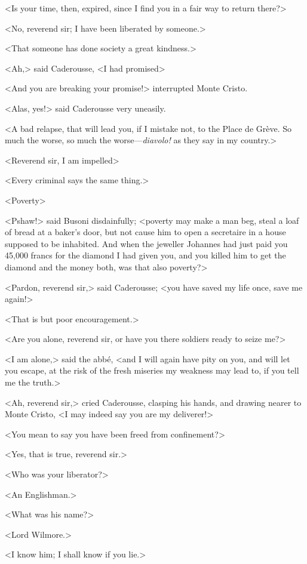  <Is your time, then, expired, since I find you in a fair way to return there?> 

 <No, reverend sir; I have been liberated by someone.> 

 <That someone has done society a great kindness.> 

 <Ah,> said Caderousse, <I had promised\longdash> 

 <And you are breaking your promise!> interrupted Monte Cristo. 

 <Alas, yes!> said Caderousse very uneasily. 

 <A bad relapse, that will lead you, if I mistake not, to the Place de Grève. So much the worse, so much the worse—\textit{diavolo!} as they say in my country.> 

 <Reverend sir, I am impelled\longdash> 

 <Every criminal says the same thing.> 

 <Poverty\longdash> 

 <Pshaw!> said Busoni disdainfully; <poverty may make a man beg, steal a loaf of bread at a baker's door, but not cause him to open a secretaire in a house supposed to be inhabited. And when the jeweller Johannes had just paid you 45,000 francs for the diamond I had given you, and you killed him to get the diamond and the money both, was that also poverty?> 

 <Pardon, reverend sir,> said Caderousse; <you have saved my life once, save me again!> 

 <That is but poor encouragement.> 

 <Are you alone, reverend sir, or have you there soldiers ready to seize me?> 

 <I am alone,> said the abbé, <and I will again have pity on you, and will let you escape, at the risk of the fresh miseries my weakness may lead to, if you tell me the truth.> 

 <Ah, reverend sir,> cried Caderousse, clasping his hands, and drawing nearer to Monte Cristo, <I may indeed say you are my deliverer!> 

 <You mean to say you have been freed from confinement?> 

 <Yes, that is true, reverend sir.> 

 <Who was your liberator?> 

 <An Englishman.> 

 <What was his name?> 

 <Lord Wilmore.> 

 <I know him; I shall know if you lie.> 

